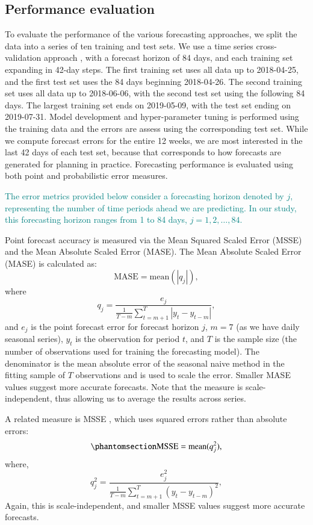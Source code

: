 \documentclass[
  authoryear,
  preprint,
  3p]{elsarticle}
\begin{document}
\subsection{Performance evaluation}\label{performance-evaluation}

To evaluate the performance of the various forecasting approaches, we
split the data into a series of ten training and test sets. We use a
time series cross-validation approach \citep{hyndman2021forecasting},
with a forecast horizon of 84 days, and each training set expanding in
42-day steps. The first training set uses all data up to 2018-04-25, and
the first test set uses the 84 days beginning 2018-04-26. The second
training set uses all data up to 2018-06-06, with the second test set
using the following 84 days. The largest training set ends on
2019-05-09, with the test set ending on 2019-07-31. Model development
and hyper-parameter tuning is performed using the training data and the
errors are assess using the corresponding test set. While we compute
forecast errors for the entire 12 weeks, we are most interested in the
last 42 days of each test set, because that corresponds to how forecasts
are generated for planning in practice. Forecasting performance is
evaluated using both point and probabilistic error measures.

\textcolor{teal}{The error metrics provided below consider a forecasting horizon denoted by $j$, representing the number of time periods ahead we are predicting. In our study, this forecasting horizon ranges from 1 to 84 days, $j= 1,2,\dots, 84$.}

Point forecast accuracy is measured via the Mean Squared Scaled Error
(MSSE) and the Mean Absolute Scaled Error (MASE). The Mean Absolute
Scaled Error (MASE) \citep{HK06, hyndman2021forecasting} is calculated
as: \[
  \text{MASE} = \text{mean}(|q_{j}|),
\] where \[
  q_{j} = \frac{ e_{j}}
 {\displaystyle\frac{1}{T-m}\sum_{t=m+1}^T |y_{t}-y_{t-m}|},
\] and \(e_{j}\) is the point forecast error for forecast horizon \(j\),
\(m = 7\) (as we have daily seasonal series), \(y_t\) is the observation
for period \(t\), and \(T\) is the sample size (the number of
observations used for training the forecasting model). The denominator
is the mean absolute error of the seasonal naive method in the fitting
sample of \(T\) observations and is used to scale the error. Smaller
MASE values suggest more accurate forecasts. Note that the measure is
scale-independent, thus allowing us to average the results across
series.

A related measure is MSSE
\citep{hyndman2021forecasting, makridakis2022m5}, which uses squared
errors rather than absolute errors:
\begin{equation}\phantomsection\label{eq-RMSSE}{
  \text{MSSE} = \text{mean}(q_{j}^2),
}\end{equation} where, \[
  q^2_{j} = \frac{ e^2_{j}}
 {\displaystyle\frac{1}{T-m}\sum_{t=m+1}^T (y_{t}-y_{t-m})^2},
\] Again, this is scale-independent, and smaller MSSE values suggest
more accurate forecasts.
\end{document}
